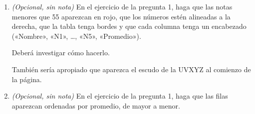 \documentclass[12pt,spanish]{article}
\begin{document}
\begin{enumerate}[leftmargin=0pt]
\begin{lstlisting}[language=]
Saludos,
Rogelio Bombal.
      \end{lstlisting}

      Por supuesto,
      el email debe decir «aprobado» o «reprobado» según corresponda,
      y debe tratar a las damas de «estimada»
      y a los caballeros de «estimado».

      La dirección de email de un alumno está formada por
      la primera letra de su nombre, un punto («\verb+.+»)
      y el apellido sin espacios,
      todo en minúsculas y seguido de \verb+@uvwyz.cl+.
      Por ejemplo,
      la dirección de María Luisa de las Mercedes es
      \verb+m.delasmercedes@uvxyz.cl+.

      El archivo con el email debe llamarse
      \texttt{\textit{Nombre}-\textit{Apellido}.txt},
      reemplazando los espacios por guiones.
      Por ejemplo,
      el email para Rolando de la Cuadra
      debe estar en el archivo \texttt{Rolando-de-la-Cuadra.txt}.

      La carita que va después de la nota
      depende del promedio obtenido:
       si es menos de 35,
      \framebox{\texttt{:(}}  si está entre 35 y 54,
      \framebox{\texttt{:)}}  si está entre 55 y 84, y
        si es 85 o más.


    \newpage
    \item \emph{(Opcional, sin nota)}
      En el ejercicio de la pregunta 1,
      haga que las notas menores que 55 aparezcan en rojo,
      que los números estén alineadas a la derecha,
      que la tabla tenga bordes
      y que cada columna tenga un encabezado
      («Nombre», «N1», \dots, «N5», «Promedio»).

      Deberá investigar cómo hacerlo.

      También sería apropiado que aparezca el escudo de la UVXYZ
      al comienzo de la página.

    \item \emph{(Opcional, sin nota)}
      En el ejercicio de la pregunta 1,
      haga que las filas aparezcan ordenadas por promedio,
      de mayor a menor.

  \end{enumerate}
\end{document}

